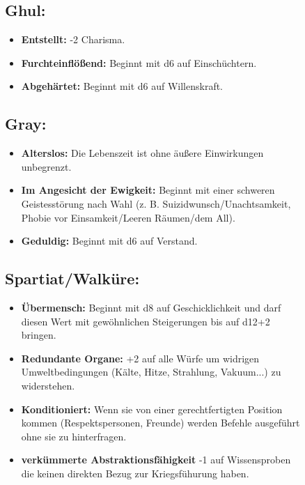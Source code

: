 \documentclass[10pt,a4paper]{report}
\begin{document}
\begin{figure}[h!]
\subsection*{Ghul:}
\begin{itemize}
\item \textbf{Entstellt:} -2 Charisma.
\item \textbf{Furchteinflößend:} Beginnt mit d6 auf Einschüchtern.
\item \textbf{Abgehärtet:} Beginnt mit d6 auf Willenskraft.
\end{itemize}
\end{figure}

\begin{figure}[h!]
\subsection*{Gray:}
\begin{itemize}
\item \textbf{Alterslos:} Die Lebenszeit ist ohne äußere Einwirkungen unbegrenzt.
\item \textbf{Im Angesicht der Ewigkeit:} Beginnt mit einer schweren Geistesstörung nach Wahl (z. B. Suizidwunsch/Unachtsamkeit, Phobie vor Einsamkeit/Leeren Räumen/dem All).
\item \textbf{Geduldig:} Beginnt mit d6 auf Verstand.
\end{itemize}
\end{figure}

\begin{figure}[h!]
\subsection*{Spartiat/Walküre:}
\begin{itemize}
\item \textbf{Übermensch:} Beginnt mit d8 auf Geschicklichkeit und darf diesen Wert mit gewöhnlichen Steigerungen bis auf d12+2 bringen.
\item \textbf{Redundante Organe:} +2 auf alle Würfe um widrigen Umweltbedingungen (Kälte, Hitze, Strahlung, Vakuum...) zu widerstehen.
\item \textbf{Konditioniert:} Wenn sie von einer gerechtfertigten Position kommen (Respektspersonen, Freunde) werden Befehle ausgeführt ohne sie zu hinterfragen.
\item \textbf{verkümmerte Abstraktionsfähigkeit} -1 auf Wissensproben die keinen direkten Bezug zur Kriegsfühurung haben.
\end{itemize}
\end{figure}
\end{document}
